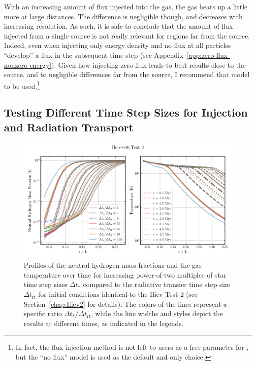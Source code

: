 With an increasing amount of flux injected into the gas, the gas heats up a little more at large
distances. The difference is negligible though, and decreases with increasing resolution. As such,
it is safe to conclude that the amount of flux injected from a single source is not really relevant
for regions far from the source. Indeed, even when injecting only energy density and no flux at all
particles ``develop'' a flux in the subsequent time step (see
Appendix~\ref{app:zero-flux-nonzero-energy}). Given how injecting zero flux leads to best results
close to the source, and to negligible differences far from the source, I recommend that model to
be used.\footnote{
In fact, the flux injection method is not left to users as a free parameter for \GEARRT, but the
``no flux'' model is used as the default and only choice.
}








\subsection{Testing Different Time Step Sizes for Injection and Radiation Transport}
\label{chap:results-star-timesteps}



\begin{figure}
\centering
\includegraphics[width=\textwidth]{figures/RHD/injection_timesteps/compareProfiles.png}%
\caption{
Profiles of the neutral hydrogen mass fractions and the gas temperature over time for increasing
power-of-two multiples of star time step sizes $\Delta t_*$ compared to the radiative transfer time
step size $\Delta t_{\mathrm{rt}}$ for initial conditions identical to the Iliev Test 2 (see
Section~\ref{chap:Iliev2} for details). The colors of the lines represent a specific ratio $\Delta
t_* / \Delta t_{\mathrm{rt}}$, while the line widths and styles depict the results at different
times, as indicated in the legends.
}
\label{fig:injection-timesteps-profiles}
\end{figure}


